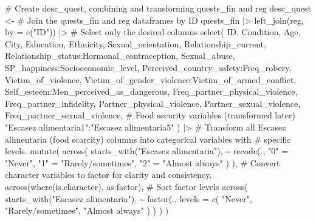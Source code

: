 \documentclass[
  bookmarksnumbered]{article}
\newenvironment{Shaded}{\begin{snugshade}}{\end{snugshade}}
\newcommand{\AttributeTok}[1]{\textcolor[rgb]{0.80,0.80,0.80}{#1}}
\newcommand{\CommentTok}[1]{\textcolor[rgb]{0.50,0.62,0.50}{#1}}
\newcommand{\FunctionTok}[1]{\textcolor[rgb]{0.94,0.94,0.56}{#1}}
\newcommand{\NormalTok}[1]{\textcolor[rgb]{0.80,0.80,0.80}{#1}}
\newcommand{\OtherTok}[1]{\textcolor[rgb]{0.94,0.94,0.56}{#1}}
\newcommand{\SpecialCharTok}[1]{\textcolor[rgb]{0.86,0.64,0.64}{#1}}
\newcommand{\StringTok}[1]{\textcolor[rgb]{0.80,0.58,0.58}{#1}}
\begin{document}
\begin{Shaded}
\begin{Highlighting}[]
\CommentTok{\# Create desc\_quest, combining and transforming quests\_fin and reg}
\NormalTok{desc\_quest }\OtherTok{\textless{}{-}}
  \CommentTok{\# Join the quests\_fin and reg dataframes by ID}
\NormalTok{  quests\_fin }\SpecialCharTok{|\textgreater{}}
  \FunctionTok{left\_join}\NormalTok{(reg, }\AttributeTok{by =} \FunctionTok{c}\NormalTok{(}\StringTok{"ID"}\NormalTok{)) }\SpecialCharTok{|\textgreater{}}
  \CommentTok{\# Select only the desired columns}
  \FunctionTok{select}\NormalTok{(}
\NormalTok{    ID,}
\NormalTok{    Condition,}
\NormalTok{    Age,}
\NormalTok{    City,}
\NormalTok{    Education,}
\NormalTok{    Ethnicity,}
\NormalTok{    Sexual\_orientation,}
\NormalTok{    Relationship\_current,}
\NormalTok{    Relationship\_status}\SpecialCharTok{:}\NormalTok{Hormonal\_contraception,}
\NormalTok{    Sexual\_abuse,}
\NormalTok{    SP\_happiness}\SpecialCharTok{:}\NormalTok{Socioeconomic\_level,}
\NormalTok{    Perceived\_country\_safety}\SpecialCharTok{:}\NormalTok{Freq\_robery,}
\NormalTok{    Victim\_of\_violence,}
\NormalTok{    Victim\_of\_gender\_violence}\SpecialCharTok{:}\NormalTok{Victim\_of\_armed\_conflict,}
\NormalTok{    Self\_esteem}\SpecialCharTok{:}\NormalTok{Men\_perceived\_as\_dangerous,}
\NormalTok{    Freq\_partner\_physical\_violence,}
\NormalTok{    Freq\_partner\_infidelity,}
\NormalTok{    Partner\_physical\_violence,}
\NormalTok{    Partner\_sexual\_violence,}
\NormalTok{    Freq\_partner\_sexual\_violence,}
    \CommentTok{\# Food security variables (transformed later)}
    \StringTok{"Escasez alimentaria1"}\SpecialCharTok{:}\StringTok{"Escasez alimentaria5"}
\NormalTok{  ) }\SpecialCharTok{|\textgreater{}}
  \CommentTok{\# Transform all \textquotesingle{}Escasez alimentaria\textquotesingle{} (food scarcity) columns into categorical variables with }
  \CommentTok{\# specific levels.}
  \FunctionTok{mutate}\NormalTok{(}
    \FunctionTok{across}\NormalTok{(}
      \FunctionTok{starts\_with}\NormalTok{(}\StringTok{"Escasez alimentaria"}\NormalTok{),}
      \SpecialCharTok{\textasciitilde{}} \FunctionTok{recode}\NormalTok{(.,}
               \StringTok{"0"} \OtherTok{=} \StringTok{"Never"}\NormalTok{,}
               \StringTok{"1"} \OtherTok{=} \StringTok{"Rarely/sometimes"}\NormalTok{,}
               \StringTok{"2"} \OtherTok{=} \StringTok{"Almost always"}
\NormalTok{      )}
\NormalTok{    ),}
    \CommentTok{\# Convert character variables to factor for clarity and consistency.}
    \FunctionTok{across}\NormalTok{(}\FunctionTok{where}\NormalTok{(is.character), as.factor),}
    \CommentTok{\# Sort factor levels}
    \FunctionTok{across}\NormalTok{(}
      \FunctionTok{starts\_with}\NormalTok{(}\StringTok{"Escasez alimentaria"}\NormalTok{),}
      \SpecialCharTok{\textasciitilde{}} \FunctionTok{factor}\NormalTok{(.,}
               \AttributeTok{levels =} \FunctionTok{c}\NormalTok{(}
                 \StringTok{"Never"}\NormalTok{,}
                 \StringTok{"Rarely/sometimes"}\NormalTok{,}
                 \StringTok{"Almost always"}
\NormalTok{               )}
\NormalTok{      )}
\NormalTok{    )}
\NormalTok{  )}
\end{Highlighting}
\end{Shaded}
\end{document}
